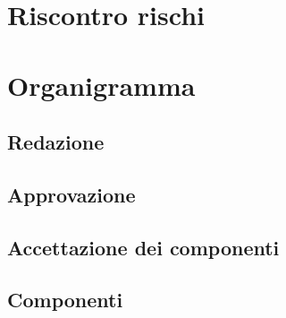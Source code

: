 \section{Riscontro rischi}



\section{Organigramma}

\subsection{Redazione}



\subsection{Approvazione}



\subsection{Accettazione dei componenti}



\subsection{Componenti}